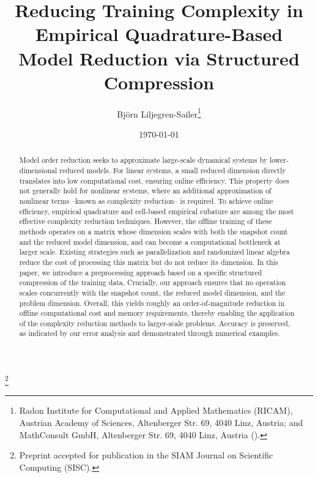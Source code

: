 \documentclass[onefignum,onetabnum]{siamart251104}
\begin{document}
\title{Reducing Training Complexity in Empirical Quadrature-Based Model Reduction via Structured Compression}


\author{Bj\"orn Liljegren-Sailer\thanks{Radon Institute for Computational and Applied Mathematics (RICAM), Austrian Academy
of Sciences, Altenberger Str. 69, 4040 Linz, Austria; and MathConsult GmbH, Altenberger Str. 69, 4040 Linz, Austria
  ().}
}
\maketitle
%
\date{\today}
%
\newcommand{\blfootnote}[1]{%
  \begingroup
  \renewcommand{\thefootnote}{}\footnote{#1}%
  \endgroup
}
\blfootnote{Preprint accepted for publication in the SIAM Journal on Scientific Computing (SISC).}

\begin{abstract}
Model order reduction seeks to approximate large-scale dynamical systems by lower-dimensional reduced models. For linear systems, a small reduced dimension directly translates into low computational cost, ensuring online efficiency. This property does not generally hold for nonlinear systems, where an additional approximation of nonlinear terms --known as complexity reduction-- is required. To achieve online efficiency, empirical quadrature and cell-based empirical cubature are among the most effective complexity reduction techniques. However, the offline training of these methods operates on a matrix whose dimension scales with both the snapshot count and the reduced model dimension, and can become a computational bottleneck at larger scale. Existing strategies such as parallelization and randomized linear algebra reduce the cost of processing this matrix but do not reduce its dimension.
In this paper, we introduce a preprocessing approach based on a specific structured compression of the training data. Crucially, our approach ensures that no operation scales concurrently with the snapshot count, the reduced model dimension, and the problem dimension. Overall, this yields roughly an order-of-magnitude reduction in offline computational cost and memory requirements, thereby enabling the application of the complexity reduction methods to larger-scale problems. Accuracy is preserved, as indicated by our error analysis and demonstrated through numerical examples.
\end{abstract}
\end{document}
